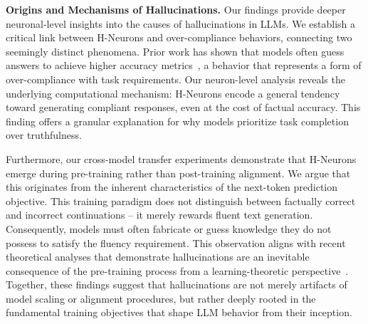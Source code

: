 \documentclass[dvipsnames]{article}
\begin{document}
\textbf{Origins and Mechanisms of Hallucinations.}\quad
Our findings provide deeper neuronal-level insights into the causes of hallucinations in LLMs. We establish a critical link between H-Neurons and over-compliance behaviors, connecting two seemingly distinct phenomena. Prior work has shown that models often guess answers to achieve higher accuracy metrics~\citep{wei2025truthrl}, a behavior that represents a form of over-compliance with task requirements. Our neuron-level analysis reveals the underlying computational mechanism: H-Neurons encode a general tendency toward generating compliant responses, even at the cost of factual accuracy. This finding offers a granular explanation for why models prioritize task completion over truthfulness. %

Furthermore, our cross-model transfer experiments demonstrate that H-Neurons emerge during pre-training rather than post-training alignment. We argue that this originates from the inherent characteristics of the next-token prediction objective. This training paradigm does not distinguish between factually correct and incorrect continuations -- it merely rewards fluent text generation. Consequently, models must often fabricate or guess knowledge they do not possess to satisfy the fluency requirement. This observation aligns with recent theoretical analyses that demonstrate hallucinations are an inevitable consequence of the pre-training process from a learning-theoretic perspective~\citep{DBLP:journals/corr/abs-2509-04664}. Together, these findings suggest that hallucinations are not merely artifacts of model scaling or alignment procedures, but rather deeply rooted in the fundamental training objectives that shape LLM behavior from their inception.
\end{document}

